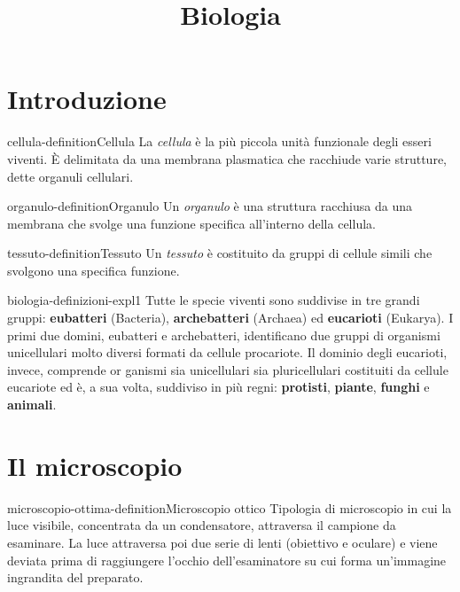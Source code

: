 \documentclass[preview]{standalone}
\begin{document}
\title{Biologia}
\genpage

\section{Introduzione}

\begin{snippetdefinition}{cellula-definition}{Cellula}
    La \textit{cellula} è la più piccola unità funzionale degli esseri
    viventi. È delimitata da una membrana plasmatica
    che racchiude varie strutture, dette organuli cellulari.
\end{snippetdefinition}

\begin{snippetdefinition}{organulo-definition}{Organulo}
    Un \textit{organulo} è una struttura racchiusa da una membrana che svolge
    una funzione specifica all'interno della cellula.
\end{snippetdefinition}

\begin{snippetdefinition}{tessuto-definition}{Tessuto}
    Un \textit{tessuto} è costituito da gruppi
    di cellule simili che svolgono
    una specifica funzione.
\end{snippetdefinition}

\begin{snippet}{biologia-definizioni-expl1}
Tutte le specie viventi sono suddivise in tre grandi gruppi:
\textbf{eubatteri} (Bacteria), \textbf{archebatteri} (Archaea)
ed \textbf{eucarioti} (Eukarya).
I primi due domini, eubatteri e archebatteri, identificano due gruppi di organismi
unicellulari molto diversi formati da cellule
procariote.
Il dominio degli eucarioti, invece, comprende or ganismi sia unicellulari
sia pluricellulari costituiti da cellule eucariote ed è,
a sua volta, suddiviso in più regni: \textbf{protisti},
\textbf{piante}, \textbf{funghi} e \textbf{animali}.
\end{snippet}

\section{Il microscopio}

\begin{snippetdefinition}{microscopio-ottima-definition}{Microscopio ottico}
    Tipologia di microscopio in cui la luce visibile, concentrata da un condensatore, attraversa
    il campione da esaminare. La luce attraversa poi due serie di lenti (obiettivo e oculare) e
    viene deviata prima di raggiungere l'occhio dell'esaminatore su cui forma un'immagine
    ingrandita del preparato.
\end{snippetdefinition}
\end{document}
